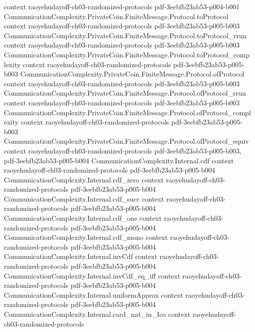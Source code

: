 \begin{theorem}
  {context}
  {raoyehudayoff-ch03-randomized-protocols}
  {pdf-3eebfb23ab53-p004-b001}
\proofstep
  {CommunicationComplexity.PrivateCoin.FiniteMessage.Protocol.toProtocol}
  {context}
  {raoyehudayoff-ch03-randomized-protocols}
  {pdf-3eebfb23ab53-p005-b003}
\proofstep
  {CommunicationComplexity.PrivateCoin.FiniteMessage.Protocol.toProtocol_rrun}
  {context}
  {raoyehudayoff-ch03-randomized-protocols}
  {pdf-3eebfb23ab53-p005-b003}
\proofstep
  {CommunicationComplexity.PrivateCoin.FiniteMessage.Protocol.toProtocol_complexity}
  {context}
  {raoyehudayoff-ch03-randomized-protocols}
  {pdf-3eebfb23ab53-p005-b003}
\proofstep
  {CommunicationComplexity.PrivateCoin.FiniteMessage.Protocol.ofProtocol}
  {context}
  {raoyehudayoff-ch03-randomized-protocols}
  {pdf-3eebfb23ab53-p005-b003}
\proofstep
  {CommunicationComplexity.PrivateCoin.FiniteMessage.Protocol.ofProtocol_rrun}
  {context}
  {raoyehudayoff-ch03-randomized-protocols}
  {pdf-3eebfb23ab53-p005-b003}
\proofstep
  {CommunicationComplexity.PrivateCoin.FiniteMessage.Protocol.ofProtocol_complexity}
  {context}
  {raoyehudayoff-ch03-randomized-protocols}
  {pdf-3eebfb23ab53-p005-b003}
\proofstep
  {CommunicationComplexity.PrivateCoin.FiniteMessage.Protocol.ofProtocol_equiv}
  {context}
  {raoyehudayoff-ch03-randomized-protocols}
  {pdf-3eebfb23ab53-p005-b003,
    pdf-3eebfb23ab53-p005-b004}
\proofstep
  {CommunicationComplexity.Internal.cdf}
  {context}
  {raoyehudayoff-ch03-randomized-protocols}
  {pdf-3eebfb23ab53-p005-b004}
\proofstep
  {CommunicationComplexity.Internal.cdf_zero}
  {context}
  {raoyehudayoff-ch03-randomized-protocols}
  {pdf-3eebfb23ab53-p005-b004}
\proofstep
  {CommunicationComplexity.Internal.cdf_succ}
  {context}
  {raoyehudayoff-ch03-randomized-protocols}
  {pdf-3eebfb23ab53-p005-b004}
\proofstep
  {CommunicationComplexity.Internal.cdf_one}
  {context}
  {raoyehudayoff-ch03-randomized-protocols}
  {pdf-3eebfb23ab53-p005-b004}
\proofstep
  {CommunicationComplexity.Internal.cdf_mono}
  {context}
  {raoyehudayoff-ch03-randomized-protocols}
  {pdf-3eebfb23ab53-p005-b004}
\proofstep
  {CommunicationComplexity.Internal.invCdf}
  {context}
  {raoyehudayoff-ch03-randomized-protocols}
  {pdf-3eebfb23ab53-p005-b004}
\proofstep
  {CommunicationComplexity.Internal.invCdf_eq_iff}
  {context}
  {raoyehudayoff-ch03-randomized-protocols}
  {pdf-3eebfb23ab53-p005-b004}
\proofstep
  {CommunicationComplexity.Internal.uniformApprox}
  {context}
  {raoyehudayoff-ch03-randomized-protocols}
  {pdf-3eebfb23ab53-p005-b004}
\proofstep
  {CommunicationComplexity.Internal.card_nat_in_Ico}
  {context}
  {raoyehudayoff-ch03-randomized-protocols}

\end{theorem}

